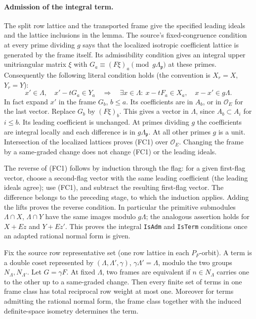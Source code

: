 \paragraph{Admission of the integral term.}
The split row lattice and the transported frame give the specified
leading ideals and the lattice inclusions in the lemma.  The
source's fixed-congruence condition at every prime dividing \(g\)
says that the localized isotropic coefficient lattice is generated
by the frame itself.  Its admissibility condition gives an integral
upper unitriangular matrix \(\xi\) with
\(G_a\equiv(F\xi)_a\pmod{g\Lambda_{\mathfrak p}}\)
at these primes.  Consequently the following literal condition
holds (the convention is \(X_r=X\), \(Y_r=Y\)):
\[
 x'\in\Lambda,\quad x'-tG_a\in Y_a
 \quad\Longrightarrow\quad
 \exists x\in\Lambda:\ x-tF_a\in X_a,\quad x-x'\in g\Lambda .
 \tag{FC1}
\]
In fact expand \(x'\) in the frame \(G_b\), \(b\le a\).
Its coefficients are in \(A_b\), or in \(\mathcal O_E\)
for the last vector.  Replace \(G_b\) by \((F\xi)_b\).
This gives a vector in \(\Lambda\), since \(A_b\subset A_i\)
for \(i\le b\).  Its leading coefficient is unchanged.
At primes dividing \(g\) the coefficients are integral locally
and each difference is in \(g\Lambda_{\mathfrak p}\).
At all other primes \(g\) is a unit.  Intersection of the
localized lattices proves (FC1) over \(\mathcal O_E\).
Changing the frame by a same-graded change does not change (FC1)
or the leading ideals.

The reverse of (FC1) follows by induction through the flag:
for a given first-flag vector, choose a second-flag vector
with the same leading coefficient (the leading ideals agree);
use (FC1), and subtract the resulting first-flag vector.
The difference belongs to the preceding stage, to which the
induction applies.  Adding the lifts proves the reverse condition.
In particular the primitive submodules
\(\Lambda\cap X\), \(\Lambda\cap Y\) have the same images
modulo \(g\Lambda\); the analogous assertion holds for
\(X+Ez\) and \(Y+Ez'\).  This proves the integral
\texttt{IsAdm} and \texttt{IsTerm} conditions once an adapted
rational normal form is given.

\begin{proposition}
\label{prop:flag-term-class-multiplicity}
Fix the source row representative set (one row lattice in each
\(P_F\)-orbit).  A term is a double coset represented by
\((\Lambda,\Lambda',\gamma)\), \(\gamma\Lambda'=\Lambda\),
modulo the two groups \(N_\Lambda,N_{\Lambda'}\).
Let \(G=\gamma F\).  At fixed \(\Lambda\), two frames are
equivalent if \(n\in N_\Lambda\) carries one to the other
up to a same-graded change.  Then every finite set of terms
in one frame class has total reciprocal row weight at most one.
Moreover for terms admitting the rational normal form, the
frame class together with the induced definite-space isometry
determines the term.
\end{proposition}

